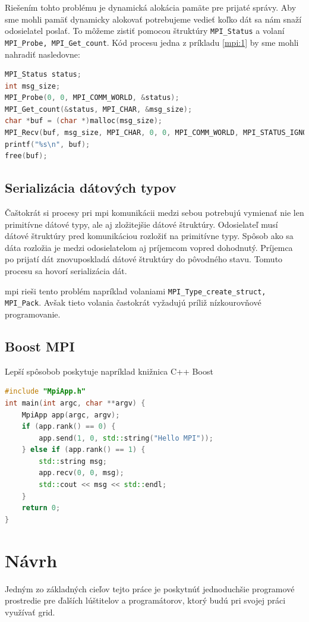 Riešením tohto problému je dynamická alokácia pamäte pre prijaté správy. Aby sme mohli pamäť dynamicky alokovať potrebujeme vedieť
koľko dát sa nám snaží odosielatel poslať. To môžeme zistiť pomocou štruktúry \texttt{MPI\_Status} a volaní \texttt{MPI\_Probe, MPI\_Get\_count}.
Kód procesu jedna z príkladu \ref{mpi:1} by sme mohli nahradiť nasledovne:
\begin{lstlisting}[language=c]
MPI_Status status;
int msg_size;
MPI_Probe(0, 0, MPI_COMM_WORLD, &status);
MPI_Get_count(&status, MPI_CHAR, &msg_size);
char *buf = (char *)malloc(msg_size);
MPI_Recv(buf, msg_size, MPI_CHAR, 0, 0, MPI_COMM_WORLD, MPI_STATUS_IGNORE);
printf("%s\n", buf);
free(buf);
\end{lstlisting}

\subsection{Serializácia dátových typov}
Čaštokrát si procesy pri \acrshort{mpi} komunikácii medzi sebou potrebujú vymienať nie len primitívne dátové typy, ale aj zložitejšie dátové štruktúry.
Odosielateľ musí dátové štruktúry pred komunikáciou rozložiť na primitívne typy. Spôsob ako sa dáta rozložia je medzi odosielatelom aj príjemcom vopred dohodnutý.
Príjemca po prijatí dát znovuposkladá dátové štruktúry do pôvodného stavu. Tomuto procesu sa hovorí serializácia dát.

\acrshort{mpi} rieši tento problém napríklad volaniami \texttt{MPI\_Type\_create\_struct, MPI\_Pack}.
Avšak tieto volania častokrát vyžadujú príliž nízkourovňové programovanie.
\subsection{Boost MPI}
Lepší spôsobob poskytuje napríklad knižnica C++ Boost
\begin{lstlisting}[language=c++]
#include "MpiApp.h"
int main(int argc, char **argv) {
    MpiApp app(argc, argv);
    if (app.rank() == 0) {
        app.send(1, 0, std::string("Hello MPI"));
    } else if (app.rank() == 1) {
        std::string msg;
        app.recv(0, 0, msg);
        std::cout << msg << std::endl;
    }
    return 0;
}
\end{lstlisting}

\section{Návrh}
Jedným zo základných cieľov tejto práce je poskytnúť jednoduchšie programové prostredie pre ďalších lúštitelov a programátorov,
ktorý budú pri svojej práci využívať grid.

